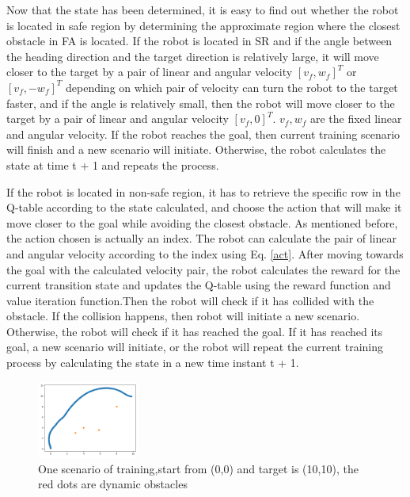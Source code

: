 \documentclass{acmtog} %
\begin{document}
	Now that the state has been determined, it is easy to find out whether the robot is located in safe region by
	determining the approximate region where the closest obstacle in FA is located. If the robot is located
	in SR and if the angle between the heading direction and the target direction is relatively large, it will move closer to the target by a pair of linear and angular velocity $[v_f,w_f]^T$ or $[v_f,-w_f]^T$ depending on which pair of velocity
	can turn the robot to the target faster, and if the angle is relatively small, then the robot will move
	closer to the target by a pair of linear and angular velocity $[v_f,0]^T$. $v_f,w_f$ are the fixed linear
	and angular velocity. If the robot reaches the goal, then current training scenario will finish and a new
	scenario will initiate. Otherwise, the robot calculates the state at time t + 1 and repeats the process. 
	
	If the robot is located in non-safe region, it has to retrieve the specific row in the Q-table according to the
	state calculated, and choose the action that will make it move closer to the goal while avoiding the
	closest obstacle. As mentioned before, the action chosen is actually an index. The robot can calculate
	the pair of linear and angular velocity according to the index using Eq. \ref{act}. After moving towards
	the goal with the calculated velocity pair, the robot calculates the reward for the current transition
	state and updates the Q-table using the reward function and value iteration function.Then the robot will check if it has
	collided with the obstacle. If the collision happens, then robot will initiate a new scenario. Otherwise,
	the robot will check if it has reached the goal. If it has reached its goal, a new scenario will initiate, or
	the robot will repeat the current training process by calculating the state in a new time instant t + 1.
	\begin{figure}[H]
		\centering
		\includegraphics[width=0.3\textwidth]{train.PNG}
		\caption{One scenario of training,start from (0,0) and target is (10,10), the red dots are dynamic obstacles}
	\end{figure}
\end{document}
